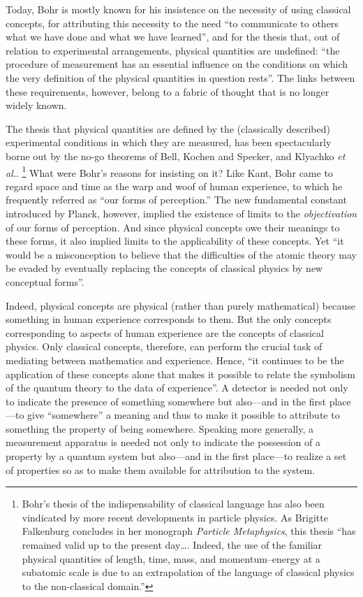 \documentclass[smallextended]{svjour3}
\begin{document}
Today, Bohr is mostly known for his insistence on the necessity of using classical concepts, for attributing this necessity to the need  ``to communicate to others what we have done and what we have learned'',\cite{Bohr-EAPHK,Bohr-APHK} and for the thesis that, out of relation to experimental arrangements, physical quantities are undefined: ``the procedure of measurement has an essential influence on the conditions on which the very definition of the physical quantities in question rests''.\cite{BohrQMPR} The links between these requirements, however, belong to a fabric of thought that is no longer widely known. 

The thesis that physical quantities are defined by the (classically described) experimental conditions in which they are measured, has been spectacularly borne out by the {no-go theorems} of Bell,\cite{Bell64} Kochen and Specker,\cite{KochenSpecker} and Klyachko \textit{et al.}\cite{Klyaetal2008}.%
\footnote{Bohr's thesis of the indispensability of classical language has also been vindicated by more recent developments in particle physics. As Brigitte Falkenburg concludes in her monograph \emph{Particle Metaphysics},\cite{Falk2007} this thesis ``has remained valid up to the present day\dots. Indeed, the use of the familiar physical quantities of length, time, mass, and momentum--energy at a subatomic scale is due to an extrapolation of the language of classical physics to the non-classical domain.''}
What were Bohr's reasons for insisting on it? Like Kant, Bohr came to regard space and time as the warp and woof of human experience, to which he frequently referred as ``our forms of perception.'' The new fundamental constant introduced by Planck, however, implied the existence of limits to the \emph{objectivation} of our forms of perception. And since physical concepts owe their meanings to these forms, it also implied limits to the applicability of these concepts. Yet ``it would be a misconception to believe that the difficulties of the atomic theory may be evaded by eventually replacing the concepts of classical physics by new conceptual forms''.\cite{BohrATDN}

Indeed, physical concepts are physical (rather than purely mathematical) because something in human experience corresponds to them. But the only concepts corresponding to aspects of human experience are the concepts of classical physics. Only classical concepts, therefore, can perform the crucial task of mediating between mathematics and experience. Hence, ``it continues to be the application of these concepts alone that makes it possible to relate the symbolism of the quantum theory to the data of experience''.\cite{BohrATDN} A detector is needed not only to indicate the presence of something somewhere but also---and in the first place---to give ``somewhere'' a meaning and thus to make it possible to attribute to something the property of being somewhere. Speaking more generally, a measurement apparatus is needed not only to indicate the possession of a property by a quantum system but also---and in the first place---to realize a set of properties so as to make them available for attribution to the system.
\end{document}
